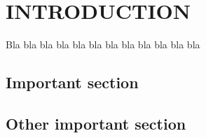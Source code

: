 \chapter{INTRODUCTION}

Bla bla bla \cite{acpow} bla bla bla \cite{faucet1999} bla bla bla \cite{votruba} bla bla bla \cite{hroch}


\section{Important section}


\section{Other important section}


\thispagestyle{empty}
